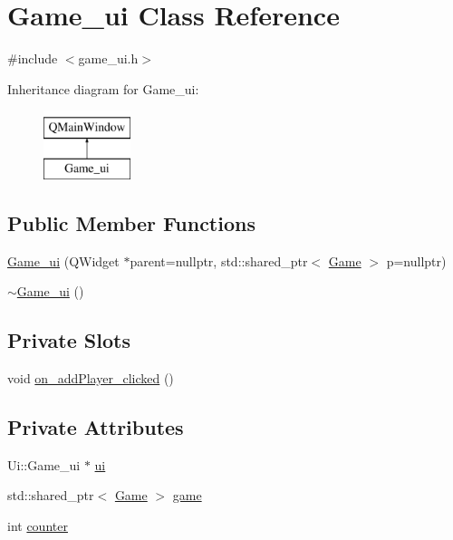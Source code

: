 \hypertarget{class_game__ui}{}\section{Game\+\_\+ui Class Reference}
\label{class_game__ui}


{\ttfamily \#include $<$game\+\_\+ui.\+h$>$}

Inheritance diagram for Game\+\_\+ui\+:\begin{figure}[H]
\begin{center}
\leavevmode
\includegraphics[height=2.000000cm]{class_game__ui}
\end{center}
\end{figure}
\subsection*{Public Member Functions}
\begin{DoxyCompactItemize}
\item 
\hyperlink{class_game__ui_abad4919c9b6622e654abfe39d8a616fa}{Game\+\_\+ui} (Q\+Widget $\ast$parent=nullptr, std\+::shared\+\_\+ptr$<$ \hyperlink{class_game}{Game} $>$ p=nullptr)
\item 
\hyperlink{class_game__ui_a57edf1bb7a598f494736343d7ea2ecfe}{$\sim$\+Game\+\_\+ui} ()
\end{DoxyCompactItemize}
\subsection*{Private Slots}
\begin{DoxyCompactItemize}
\item 
void \hyperlink{class_game__ui_ac51a9a1bf2ef83a4a95312265cee4741}{on\+\_\+add\+Player\+\_\+clicked} ()
\end{DoxyCompactItemize}
\subsection*{Private Attributes}
\begin{DoxyCompactItemize}
\item 
Ui\+::\+Game\+\_\+ui $\ast$ \hyperlink{class_game__ui_a9ae0a3d7e53c8beec44db17065012192}{ui}
\item 
std\+::shared\+\_\+ptr$<$ \hyperlink{class_game}{Game} $>$ \hyperlink{class_game__ui_a687057a7aaf0f8d4d5eeeee09a68dd38}{game}
\item 
int \hyperlink{class_game__ui_aef6afc3dd6d9904d9f0aadccd30b7775}{counter}
\end{DoxyCompactItemize}


